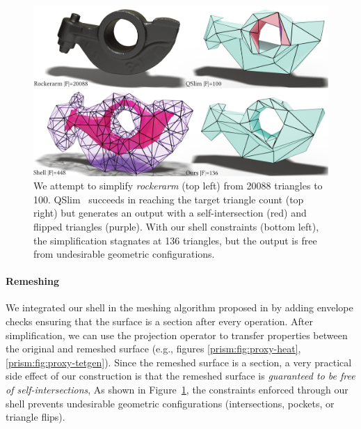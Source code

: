 \begin{figure}
    \centering
    \includegraphics[width=1\linewidth]{prism-tex/figs/rockerarm_qslim}
    \caption{We attempt to simplify \protect\emph{rockerarm} (top left) from 20088 triangles to 100. QSlim~\cite{garland1998simplifying} succeeds in reaching the target triangle count (top right) but generates an output with a self-intersection (red) and flipped triangles (purple).
    With our shell constraints (bottom left), the simplification stagnates at 136 triangles, but the output is free from undesirable geometric configurations. 
    }
    \label{prism:fig:qslim100}
    
\end{figure}

\paragraph{Remeshing}
We integrated our shell in the meshing algorithm proposed in \cite{dunyach2013adaptive} by adding envelope checks ensuring that the surface is a section after every operation. After simplification, we can use the projection operator to transfer properties between the original and remeshed surface (e.g., figures \ref{prism:fig:proxy-heat}, \ref{prism:fig:proxy-tetgen}).
Since the  remeshed surface is a section, a very practical side effect of our construction is that the remeshed surface is \emph{guaranteed to be free of self-intersections}, 
As shown in Figure~\ref{prism:fig:qslim100}, the constraints enforced through our shell prevents undesirable geometric configurations (intersections, pockets, or triangle flips).

